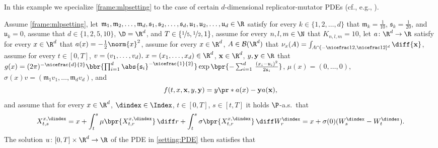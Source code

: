 \begin{example}
	\label{exampleMLP:hamel}
	In this example we specialize \cref{frame:mlpsetting} to the case of certain $d$-dimensional replicator-mutator PDEs (cf., e.g., \cite{Hamel2020}). 

	Assume 
		\cref{frame:mlpsetting}, 
	let
		$\mathfrak{m}_1, \mathfrak{m}_2, \dots,\mathfrak{m}_d, \mathfrak{s}_1, \mathfrak{s}_2, \dots, \mathfrak{s}_d,\mathfrak{u}_1, \mathfrak{u}_2,\dots,\mathfrak{u}_d \in \R$
	satisfy 
		for every
			$k \in \{1,2,\dots,d\}$
		that
			$\mathfrak{m}_k = \tfrac{1}{10}$,
			$\mathfrak{s}_k = \tfrac{1}{20}$,	and
			$\mathfrak{u}_k = 0$,
	assume that
		$d\in\{1,2,5,10\}$,
		$\D = \R^{d}$, and
		$T\in\{\nicefrac{1}{5},\nicefrac{1}{2},1\}$,
	assume for every 
		$n,l,m\in \N$
	that 
		$K_{n,l,m} = 10$,
	let
		$a \colon \R^d \to \R$
	satisfy 
		for every
			$x \in \R^d$
		that
			$a(x) = -\frac{1}{2}\norm{x}^2$,
	assume for every
		$x \in \R^d$,
		$A \in \mathcal{B}(\R^d)$
	that
		$\nu_x(A) = \int_{A\cap[-\nicefrac12,\nicefrac12]^d} \diff {\mathbf x}$,
	assume for every
		$t \in [0,T]$,
		$v= (v_1,\dots,v_d),\,x = (x_1,\dots,x_d)\in \R^d$,
		$\mathbf{x} \in \R^d$,
		$y,\mathbf{y} \in \R$
	that
		$g(x)= (2\pi)^{-\nicefrac{d}{2}} \bbr{\prod_{ i = 1 }^d \abs{\mathfrak{s}_i}^{-\nicefrac{1}{2}}} \exp \bpr{-\sum_{i = 1}^d \, \frac{(x_i - \mathfrak{u}_i )^2}{2\mathfrak{s}_i}}$,
		$\mu(x)=(0,\dots,0)$,
		$\sigma(x)v=(\mathfrak{m}_1 v_1, \dots, \mathfrak{m}_d v_d)$, and
	\begin{equation}
		f(t,x,\mathbf{x},y,\mathbf{y}) 
		=
		y \pr*{a(x) -  \mathbf{y}  a({\mathbf x}) }
		,
	\end{equation}
	and assume that 
		for every 
			$x\in \R^{d}$, 
			$\dindex \in \Index$, 
			$t\in [0,T]$, 
			$s\in [t,T]$ 
		it holds $\P$-a.s.\ that
		\begin{equation}
			X^{x,\dindex}_{t,s} 
			= 
			x + \int_{t}^{s} \mu\bpr{X^{x,\dindex}_{t,r}} \, \diff r + \int^{s}_{t} \sigma \bpr{X^{x,\dindex}_{t,r}} \, \diff W^{\dindex}_{r} 
			=
			x+\sigma(0)(W^\dindex_s-W^\dindex_t)
			.
		\end{equation}
	The solution 
		$u\colon[0,T]\times \R^d \to \R$ 
		of the PDE in \eqref{setting:PDE} then satisfies that 

\end{example}
